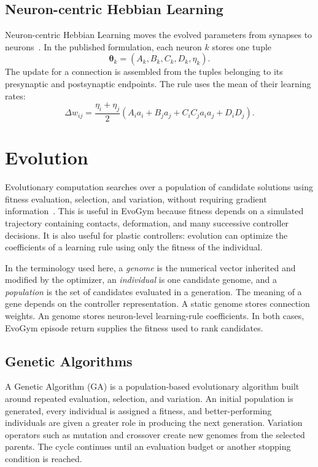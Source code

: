 \subsection{Neuron-centric Hebbian Learning}

Neuron-centric Hebbian Learning moves the evolved parameters from synapses to neurons~\cite{ferigo2024nchl}. In the published formulation, each neuron $k$ stores one tuple
\begin{equation}
  \boldsymbol{\theta}_k=(A_k,B_k,C_k,D_k,\eta_k).
\end{equation}
The update for a connection is assembled from the tuples belonging to its presynaptic and postsynaptic endpoints. The rule uses the mean of their learning rates:
\begin{equation}
  \Delta w_{ij}=\frac{\eta_i+\eta_j}{2}\left(
    A_i a_i + B_j a_j + C_iC_j a_i a_j + D_iD_j
  \right).
  \label{eq:nchl-published}
\end{equation}

\section{Evolution}

Evolutionary computation searches over a population of candidate solutions using fitness evaluation, selection, and variation, without requiring gradient information~\cite{eiben2015evolutionary}. This is useful in EvoGym because fitness depends on a simulated trajectory containing contacts, deformation, and many successive controller decisions. It is also useful for plastic controllers: evolution can optimize the coefficients of a learning rule using only the fitness of the individual.

In the terminology used here, a \emph{genome} is the numerical vector inherited and modified by the optimizer, an \emph{individual} is one candidate genome, and a \emph{population} is the set of candidates evaluated in a generation. The meaning of a gene depends on the controller representation. A static genome stores connection weights. An \nchl{} genome stores neuron-level learning-rule coefficients. In both cases, EvoGym episode return supplies the fitness used to rank candidates.

\subsection{Genetic Algorithms}

A Genetic Algorithm (GA) is a population-based evolutionary algorithm built around repeated evaluation, selection, and variation. An initial population is generated, every individual is assigned a fitness, and better-performing individuals are given a greater role in producing the next generation. Variation operators such as mutation and crossover create new genomes from the selected parents. The cycle continues until an evaluation budget or another stopping condition is reached.

